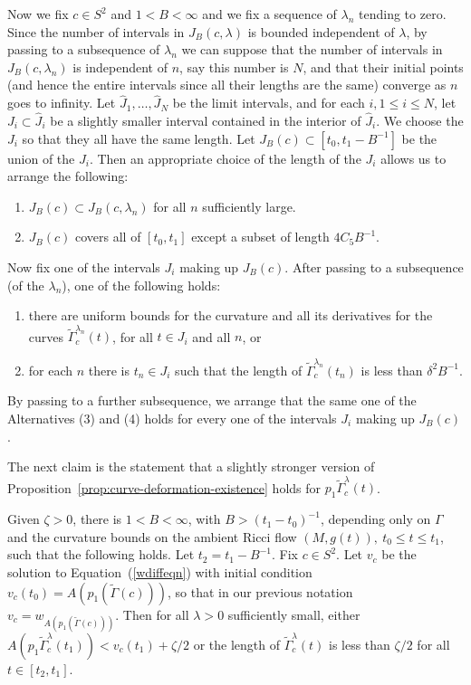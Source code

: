 Now we fix $c\in S^2$ and $1<B<\infty$ and we fix a sequence of
$\lambda_n$ tending to zero. Since the number of intervals in
$J_B(c,\lambda)$ is bounded independent of $\lambda$, by passing to
a subsequence of $\lambda_n$ we can suppose that the number of
intervals in $J_B(c,\lambda_n)$ is independent of $n$, say this
number is $N$, and that their initial points (and hence the entire
intervals since all their lengths are the same) converge as $n$ goes
to infinity. Let $\hat J_1,\ldots, \hat J_N$ be the limit intervals,
and for each $i, 1\le i\le N$, let $J_i\subset \hat J_i$ be a
slightly smaller interval contained in the interior of $\hat J_i$.
We choose the $J_i$ so that they all have the same length. Let
$J_B(c)\subset [t_0,t_1-B^{-1}]$ be the union of the $J_i$. Then an
appropriate choice of the length of the $J_i$ allows us to arrange
the following:
\begin{enumerate}
\item[(1)] $J_B(c)\subset J_B(c,\lambda_n)$ for all $n$ sufficiently
large.
\item[(2)] $J_B(c)$ covers all of $[t_0,t_1]$ except a subset of length
$4C_5B^{-1}$.
\end{enumerate}

Now fix one of the intervals $J_i$ making up $J_B(c)$. After passing
to a subsequence (of the $\lambda_n$), one of the following holds:
\begin{enumerate}
\item[(3)] there are uniform bounds for the curvature and all its
derivatives for the curves $\widetilde\Gamma_c^{\lambda_n}(t)$, for
all $ t\in J_i$ and all $n$, or
\item [(4)] for each $n$ there is $t_n\in J_i$ such that the length of
$\widetilde\Gamma_c^{\lambda_n}(t_n)$ is less than $\delta^2B^{-1}$.
\end{enumerate}

By passing to a further subsequence, we arrange that the same one of
the Alternatives (3) and (4) holds for every  one of the intervals
$J_i$ making up $J_B(c)$.

The next claim is the statement that a slightly stronger version of
Proposition~\ref{prop:curve-deformation-existence} holds for $p_1\widetilde\Gamma_c^\lambda(t)$.


\begin{lemma}
\label{lem:curve-deformation-single-point-estimate}
\label{xistronger}
Given $\zeta>0$, there is   $1<B<\infty$, with $B>(t_1-t_0)^{-1}$,
depending only on $\Gamma$ and the curvature bounds on the ambient
Ricci flow $(M,g(t)),\ t_0\le t\le t_1$, such that the following
holds. Let $t_2=t_1-B^{-1}$. Fix $ c\in S^2$. Let $v_c$ be the
solution to Equation~(\ref{wdiffeqn}) with initial condition
$v_{c}(t_0)=A(p_1(\widetilde\Gamma(c)))$, so that in our previous
notation $v_c=w_{A(p_1(\widetilde\Gamma(c)))}$. Then for all
$\lambda>0$ sufficiently small, either
$A(p_1\widetilde\Gamma_c^\lambda(t_1))<v_c(t_1)+\zeta/2$ or the
length of $\widetilde\Gamma_c^\lambda(t)$ is less than $\zeta/2$ for
all $t\in [t_2,t_1]$.
\end{lemma}



